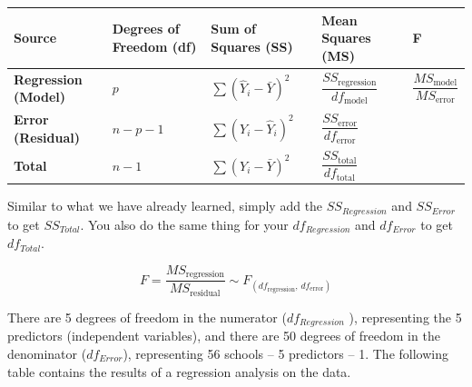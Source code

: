 \documentclass[
  letterpaper,
  DIV=11,
  numbers=noendperiod]{scrreprt}
\begin{document}
\begin{longtable}[]{@{}
  >{\raggedright\arraybackslash}p{}
  >{\raggedright\arraybackslash}p{}
  >{\raggedright\arraybackslash}p{}
  >{\raggedright\arraybackslash}p{}
  >{\raggedright\arraybackslash}p{}@{}}
\toprule\noalign{}
\begin{minipage}[b]{\linewidth}\raggedright
Source
\end{minipage} & \begin{minipage}[b]{\linewidth}\raggedright
Degrees of Freedom (df)
\end{minipage} & \begin{minipage}[b]{\linewidth}\raggedright
Sum of Squares (SS)
\end{minipage} & \begin{minipage}[b]{\linewidth}\raggedright
Mean Squares (MS)
\end{minipage} & \begin{minipage}[b]{\linewidth}\raggedright
F
\end{minipage} \\
\midrule\noalign{}
\endhead
\bottomrule\noalign{}
\endlastfoot
\textbf{Regression (Model)} & \(p\) & \(\sum (\hat{Y}_i - \bar{Y})^2\) &
\(\dfrac{SS_{\text{regression}}}{df_{\text{model}}}\) &
\(\dfrac{MS_{\text{model}}}{MS_{\text{error}}}\) \\
\textbf{Error (Residual)} & \(n - p - 1\) & \(\sum (Y_i - \hat{Y}_i)^2\)
& \(\dfrac{SS_{\text{error}}}{df_{\text{error}}}\) & \\
\textbf{Total} & \(n - 1\) & \(\sum (Y_i - \bar{Y})^2\) &
\(\dfrac{SS_{\text{total}}}{df_{\text{total}}}\) & \\
\end{longtable}

Similar to what we have already learned, simply add the
\(SS_{Regression}\) and \(SS_{Error}\) to get \(SS_{𝑇𝑜𝑡𝑎𝑙}\). You also
do the same thing for your \(df_{Regression}\) and \(df_{Error}\) to get
\(df_{𝑇𝑜𝑡𝑎𝑙}\).

\[
F = \frac{MS_{\text{regression}}}{MS_{\text{residual}}} \sim F_{(df_{\text{regression}}, \, df_{\text{error}})}
\]

There are 5 degrees of freedom in the numerator (\(df_{Regression}\) ),
representing the 5 predictors (independent variables), and there are 50
degrees of freedom in the denominator (\(df_{Error}\)), representing 56
schools -- 5 predictors -- 1. The following table contains the results
of a regression analysis on the data.
\end{document}

